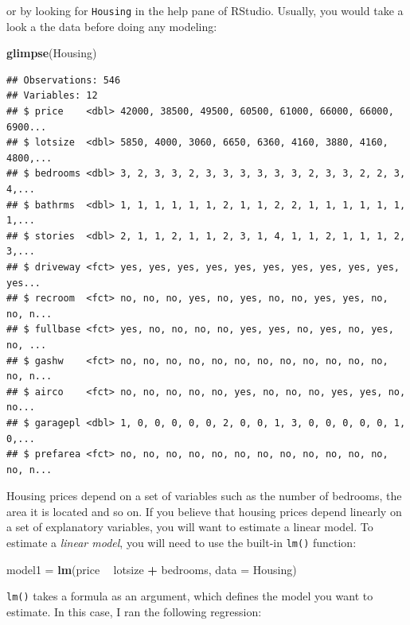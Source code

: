\documentclass[]{gitbook}
\newenvironment{Shaded}{\begin{snugshade}}{\end{snugshade}}
\newcommand{\DataTypeTok}[1]{\textcolor[rgb]{0.13,0.29,0.53}{#1}}
\newcommand{\KeywordTok}[1]{\textcolor[rgb]{0.13,0.29,0.53}{\textbf{#1}}}
\newcommand{\NormalTok}[1]{#1}
\newcommand{\OperatorTok}[1]{\textcolor[rgb]{0.81,0.36,0.00}{\textbf{#1}}}
\newcommand{\StringTok}[1]{\textcolor[rgb]{0.31,0.60,0.02}{#1}}
\theoremstyle{definition}
\theoremstyle{definition}
\theoremstyle{definition}
\theoremstyle{remark}
\begin{document}
or by looking for \texttt{Housing} in the help pane of RStudio. Usually,
you would take a look a the data before doing any modeling:

\begin{Shaded}
\begin{Highlighting}[]
\KeywordTok{glimpse}\NormalTok{(Housing)}
\end{Highlighting}
\end{Shaded}

\begin{verbatim}
## Observations: 546
## Variables: 12
## $ price    <dbl> 42000, 38500, 49500, 60500, 61000, 66000, 66000, 6900...
## $ lotsize  <dbl> 5850, 4000, 3060, 6650, 6360, 4160, 3880, 4160, 4800,...
## $ bedrooms <dbl> 3, 2, 3, 3, 2, 3, 3, 3, 3, 3, 3, 2, 3, 3, 2, 2, 3, 4,...
## $ bathrms  <dbl> 1, 1, 1, 1, 1, 1, 2, 1, 1, 2, 2, 1, 1, 1, 1, 1, 1, 1,...
## $ stories  <dbl> 2, 1, 1, 2, 1, 1, 2, 3, 1, 4, 1, 1, 2, 1, 1, 1, 2, 3,...
## $ driveway <fct> yes, yes, yes, yes, yes, yes, yes, yes, yes, yes, yes...
## $ recroom  <fct> no, no, no, yes, no, yes, no, no, yes, yes, no, no, n...
## $ fullbase <fct> yes, no, no, no, no, yes, yes, no, yes, no, yes, no, ...
## $ gashw    <fct> no, no, no, no, no, no, no, no, no, no, no, no, no, n...
## $ airco    <fct> no, no, no, no, no, yes, no, no, no, yes, yes, no, no...
## $ garagepl <dbl> 1, 0, 0, 0, 0, 0, 2, 0, 0, 1, 3, 0, 0, 0, 0, 0, 1, 0,...
## $ prefarea <fct> no, no, no, no, no, no, no, no, no, no, no, no, no, n...
\end{verbatim}

Housing prices depend on a set of variables such as the number of
bedrooms, the area it is located and so on. If you believe that housing
prices depend linearly on a set of explanatory variables, you will want
to estimate a linear model. To estimate a \emph{linear model}, you will
need to use the built-in \texttt{lm()} function:

\begin{Shaded}
\begin{Highlighting}[]
\NormalTok{model1 =}\StringTok{ }\KeywordTok{lm}\NormalTok{(price }\OperatorTok{~}\StringTok{ }\NormalTok{lotsize }\OperatorTok{+}\StringTok{ }\NormalTok{bedrooms, }\DataTypeTok{data =}\NormalTok{ Housing)}
\end{Highlighting}
\end{Shaded}

\texttt{lm()} takes a formula as an argument, which defines the model
you want to estimate. In this case, I ran the following regression:
\end{document}
